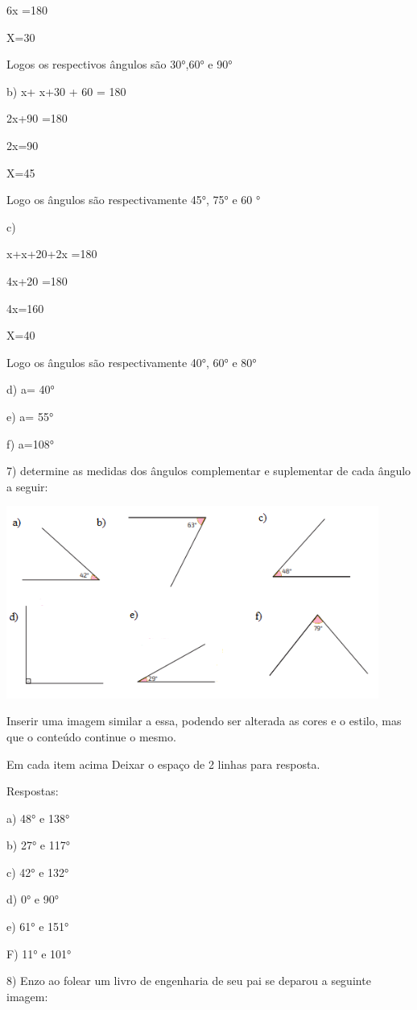 6x =180

X=30

Logos os respectivos ângulos são 30°,60° e 90°

b) x+ x+30 + 60 = 180

2x+90 =180

2x=90

X=45

Logo os ângulos são respectivamente 45°, 75° e 60 °

c)

x+x+20+2x =180

4x+20 =180

4x=160

X=40

Logo os ângulos são respectivamente 40°, 60° e 80°

d) a= 40°

e) a= 55°

f) a=108°

7) determine as medidas dos ângulos complementar e suplementar de cada
ângulo a seguir:

\includegraphics[width=4.81667in,height=2.48373in]{./imgSAEB_8_MAT/media/image30.png}

Inserir uma imagem similar a essa, podendo ser alterada as cores e o
estilo, mas que o conteúdo continue o mesmo.

Em cada item acima Deixar o espaço de 2 linhas para resposta.

Respostas:

a) 48° e 138°

b) 27° e 117°

c) 42° e 132°

d) 0° e 90°

e) 61° e 151°

F) 11° e 101°

8) Enzo ao folear um livro de engenharia de seu pai se deparou a
seguinte imagem:

